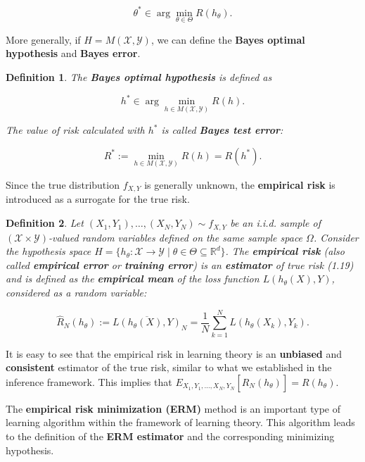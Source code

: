\documentclass{report}
\newtheorem{definition}{Definition}[chapter]
\begin{document}
\begin{equation}
\theta^* \in \arg \min_{\theta \in \Theta} R(h_\theta).
\end{equation}

More generally, if $H = M(\mathcal{X}, \mathcal{Y})$, we can define the \textbf{Bayes optimal hypothesis} and \textbf{Bayes error}.

\begin{definition}
The \textbf{Bayes optimal hypothesis} is defined as

\begin{equation}
h^*\in \arg \min_{h \in M(\mathcal{X}, \mathcal{Y})} R(h).
\end{equation}

The value of risk calculated with $h^*$ is called \textbf{Bayes test error}:

\begin{equation}
R^* := \min_{h \in M(\mathcal{X}, \mathcal{Y})} R(h) = R(h^*).
\end{equation}
\end{definition}

Since the true distribution $f_{X,Y}$ is generally unknown, the \textbf{empirical risk} is introduced as a surrogate for the true risk.

\begin{definition}
Let $(X_1, Y_1),\dots,(X_N, Y_N) \sim f_{X,Y}$ be an i.i.d. sample of $(\mathcal{X} \times \mathcal{Y})$-valued random variables defined on the same sample space $\Omega$. Consider the hypothesis space $H=\{h_\theta : \mathcal{X} \to \mathcal{Y} \mid\theta\in\Theta\subseteq\mathbb{R}^d\}$. The \textbf{empirical risk} (also called \textbf{empirical error} or \textbf{training error}) is an \textbf{estimator} of true risk (1.19) and is defined as the \textbf{empirical mean} of the loss function $L(h_\theta(X), Y)$, considered as a random variable:

\begin{equation}
\hat{R}_N(h_\theta) := \overline{L(h_\theta(X),Y)}_N = \frac{1}{N}\sum_{k=1}^{N}L(h_\theta(X_k),Y_k).
\end{equation}
\end{definition}

It is easy to see that the empirical risk in learning theory is an \textbf{unbiased} and \textbf{consistent} estimator of the true risk, similar to what we established in the inference framework. This implies that $E_{X_1,Y_1,\dots,X_N,Y_N}[\hat{R}_N(h_\theta)] =  R(h_\theta)$.

The \textbf{empirical risk minimization (ERM)} method is an important type of learning algorithm within the framework of learning theory. This algorithm leads to the definition of the \textbf{ERM estimator} and the corresponding minimizing hypothesis.
\end{document}
